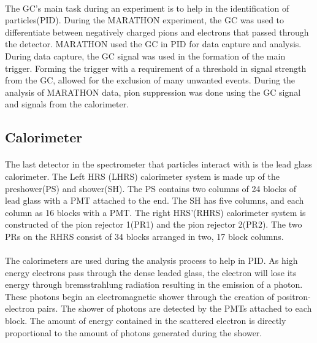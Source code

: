 	\paragraph{}The GC's main task during an experiment is to help in the identification of particles(PID). During the MARATHON experiment, the GC was used to differentiate between negatively charged pions and electrons that passed through the detector. MARATHON used the GC in PID for data capture and analysis. During data capture, the GC signal was used in the formation of the main trigger. Forming the trigger with a requirement of a threshold in signal strength from the GC, allowed for the exclusion of many unwanted events. During the analysis of MARATHON data, pion suppression was done using the GC signal and signals from the calorimeter.   
	\subsection{Calorimeter}\label{sec:Cal}
	\paragraph{}The last detector in the spectrometer that particles interact with is the lead glass calorimeter. The Left HRS (LHRS) calorimeter system is made up of the preshower(PS) and shower(SH). The PS contains two columns of 24 blocks of lead glass with a PMT attached to the end. The SH has five columns, and each column as 16 blocks with a PMT. The right HRS'(RHRS) calorimeter system is constructed of the pion rejector 1(PR1) and the pion rejector 2(PR2). The two PRs on the RHRS consist of 34 blocks arranged in two, 17 block columns. 
	\paragraph{}The calorimeters are used during the analysis process to help in PID. As high energy electrons pass through the dense leaded glass, the electron will lose its energy through bremsstrahlung radiation resulting in the emission of a photon. These photons begin an electromagnetic shower through the creation of positron-electron pairs. The shower of photons are detected by the PMTs attached to each block. The amount of energy contained in the scattered electron is directly proportional to the amount of photons generated during the shower.
